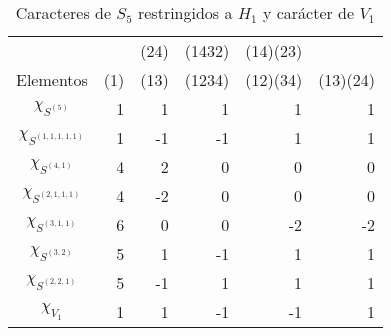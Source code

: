 \documentclass[12pt]{book}
\theoremstyle{definition}
\newcounter{in}
\begin{document}
  \begin{table}[!hbtp]
    \centering
    \begin{small}
      \begin{tabular}{c |r r r r r}
        & & (24) & (1432) & (14)(23) & \\
        Elementos & (1) & (13) & (1234) & (12)(34) & (13)(24) \\
        \hline
        $\chi_{S^{(5)}}$       & 1 & 1 & 1 & 1 & 1 \\
        $\chi_{S^{(1,1,1,1,1)}}$ & 1 & -1 & -1 & 1 & 1 \\
        $\chi_{S^{(4,1)}}$      & 4 & 2 & 0 & 0 & 0 \\
        $\chi_{S^{(2,1,1,1)}}$   & 4 & -2 & 0 & 0 & 0 \\
        $\chi_{S^{(3,1,1)}}$     & 6 & 0 & 0 & -2 & -2 \\
        $\chi_{S^{(3,2)}}$      & 5 & 1 & -1 & 1 & 1 \\
        $\chi_{S^{(2,2,1)}}$    & 5 & -1 & 1 & 1 & 1 \\
        \hline
        $\chi_{V_{1}}$ & 1 & 1 & -1 & -1 & 1 \\
      \end{tabular}

    \end{small}
    \caption{Caracteres de $S_5$ restringidos a $H_{1}$ y carácter de $V_{1}$}
    \label{tab:restriccion-H_1}
  \end{table}
\end{document}
